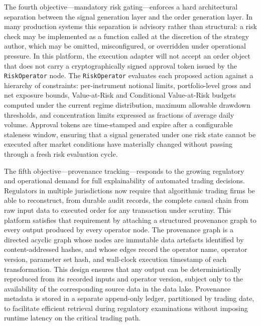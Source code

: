 \documentclass[12pt,openany]{book}
\numberwithin{equation}{chapter}
\theoremstyle{plain}
\theoremstyle{definition}
\theoremstyle{remark}
\begin{document}
The fourth objective—mandatory risk gating—enforces a hard architectural separation between the signal generation layer and the order generation layer. In many production systems this separation is advisory rather than structural: a risk check may be implemented as a function called at the discretion of the strategy author, which may be omitted, misconfigured, or overridden under operational pressure. In this platform, the execution adapter will not accept an order object that does not carry a cryptographically signed approval token issued by the \texttt{RiskOperator} node. The \texttt{RiskOperator} evaluates each proposed action against a hierarchy of constraints: per-instrument notional limits, portfolio-level gross and net exposure bounds, Value-at-Risk and Conditional Value-at-Risk budgets computed under the current regime distribution, maximum allowable drawdown thresholds, and concentration limits expressed as fractions of average daily volume. Approval tokens are time-stamped and expire after a configurable staleness window, ensuring that a signal generated under one risk state cannot be executed after market conditions have materially changed without passing through a fresh risk evaluation cycle.

The fifth objective—provenance tracking—responds to the growing regulatory and operational demand for full explainability of automated trading decisions. Regulators in multiple jurisdictions now require that algorithmic trading firms be able to reconstruct, from durable audit records, the complete causal chain from raw input data to executed order for any transaction under scrutiny. This platform satisfies that requirement by attaching a structured provenance graph to every output produced by every operator node. The provenance graph is a directed acyclic graph whose nodes are immutable data artefacts identified by content-addressed hashes, and whose edges record the operator name, operator version, parameter set hash, and wall-clock execution timestamp of each transformation. This design ensures that any output can be deterministically reproduced from its recorded inputs and operator version, subject only to the availability of the corresponding source data in the data lake. Provenance metadata is stored in a separate append-only ledger, partitioned by trading date, to facilitate efficient retrieval during regulatory examinations without imposing runtime latency on the critical trading path.
\end{document}
